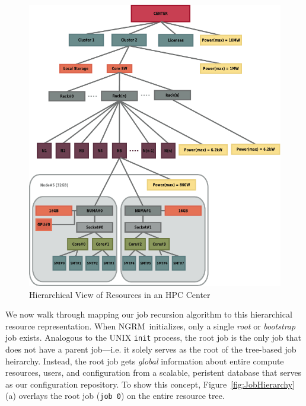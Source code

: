\documentclass[10pt]{article}
\newcommand{\ngrm}{NGRM}
\begin{document}
\begin{figure}
\centering
\includegraphics[scale=0.90]{../fig/resource-hierarchy}
\caption{Hierarchical View of Resources in an HPC Center}
\label{fig:ResHierarchy}
\end{figure}

We now walk through mapping our job recursion algorithm to this hierarchical
resource representation.
When \ngrm\ initializes, only a single {\em root} or {\em
bootstrap} job exists. Analogous to the
UNIX {\tt init} process, the root job is the only job
that does not have a parent job---i.e. it solely serves as the root of
the tree-based job heirarchy. 
Instead,  the root job gets {\em global} information about entire compute resources,
users, and configuration from a scalable, peristent database that 
serves as our configuration repository.
To show this concept, Figure~\ref{fig:JobHierarchy}(a) overlays the root job ({\tt job 0})
on the entire resource tree. 



\end{document}

